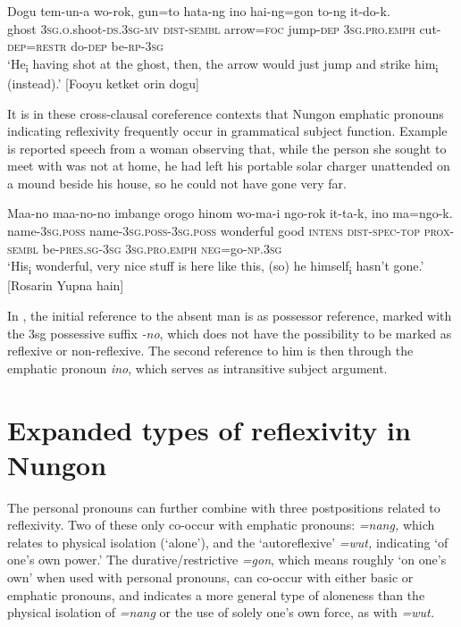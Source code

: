 \documentclass[output=paper,colorlinks,citecolor=brown]{langscibook}
\begin{document}
\ea%
    \label{ex:sarvasy:28}
    \gll    Dogu   tem-un-a      wo-rok,   gun=to   hata-ng ino     hai-ng=gon     to-ng   it-do-k.\\
            ghost  \textsc{3sg.o.}shoot-\textsc{ds.3sg-mv}  \textsc{dist-sembl}  arrow=\textsc{foc}  jump-\textsc{dep} \textsc{3sg.pro.emph}  cut\textsc{{}-dep=restr} do\textsc{{}-dep} be\textsc{{}-rp-3sg}\\
    \glt    ‘He\textsubscript{i} having shot at the ghost, then, the arrow would just jump and strike him\textsubscript{i} (instead).’ [Fooyu ketket orin dogu]
\z

It is in these cross-clausal coreference contexts that Nungon emphatic pronouns indicating reflexivity frequently occur in grammatical subject function. Example  is reported speech from a woman observing that, while the person she sought to meet with was not at home, he had left his portable solar charger unattended on a mound beside his house, so he could not have gone very far.

\ea%
    \label{ex:sarvasy:29}
    \gll    Maa-no     maa-no-no       imbange   orogo   hinom wo-ma-i   ngo-rok   it-ta-k,       ino     ma=ngo-k.\\
            name-\textsc{3sg.poss}  name-\textsc{3sg.poss-3sg.poss}  wonderful  good  \textsc{intens} \textsc{dist-spec-top}  \textsc{prox-sembl}  be-\textsc{pres.sg-3sg}  \textsc{3sg.pro.emph}  \textsc{neg}=go-\textsc{np.3sg}\\
    \glt    ‘His\textsubscript{i} wonderful, very nice stuff is here like this, (so) he himself\textsubscript{i} hasn’t gone.’ [Rosarin Yupna hain]
\z

In , the initial reference to the absent man is as possessor reference, marked with the 3sg possessive suffix \textit{{}-no}, which does not have the possibility to be marked as reflexive or non-reflexive. The second reference to him is then through the emphatic pronoun \textit{ino}, which serves as intransitive subject argument. 

\section{Expanded types of reflexivity in Nungon}\label{sec:sarvasy:4}

The personal pronouns can further combine with three postpositions related to reflexivity. Two of these only co-occur with emphatic pronouns: \textit{=nang,} which relates to physical isolation (‘alone’), and the ‘autoreflexive’ \textit{=wut,} indicating ‘of one’s own power.’ The durative/restrictive \textit{=gon}, which means roughly ‘on one’s own’ when used with personal pronouns, can co-occur with either basic or emphatic pronouns, and indicates a more general type of aloneness than the physical isolation of \textit{=nang} or the use of solely one’s own force, as with \textit{=wut.} 
\end{document}
